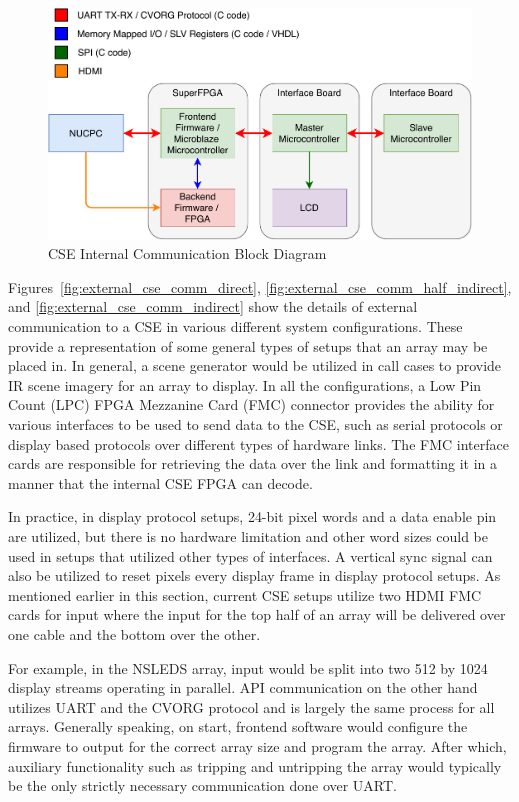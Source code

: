     \begin{figure}
        \centering
        \includegraphics[width=1.0\textwidth]{fig/cse_comm_block.pdf}
        \caption{CSE Internal Communication Block Diagram}
        \label{fig:cse_comm_block}
    \end{figure}

    Figures~\ref{fig:external_cse_comm_direct}, \ref{fig:external_cse_comm_half_indirect}, and \ref{fig:external_cse_comm_indirect} show the details of external communication to a CSE in various different system configurations. These provide a representation of some general types of setups that an array may be placed in. In general, a scene generator would be utilized in call cases to provide IR scene imagery for an array to display. In all the configurations, a Low Pin Count (LPC) FPGA Mezzanine Card (FMC) connector provides the ability for various interfaces to be used to send data to the CSE, such as serial protocols or display based protocols over different types of hardware links. The FMC interface cards are responsible for retrieving the data over the link and formatting it in a manner that the internal CSE FPGA can decode.

    In practice, in display protocol setups, 24-bit pixel words and a data enable pin are utilized, but there is no hardware limitation and other word sizes could be used in setups that utilized other types of interfaces. A vertical sync signal can also be utilized to reset pixels every display frame in display protocol setups. As mentioned earlier in this section, current CSE setups utilize two HDMI FMC cards for input where the input for the top half of an array will be delivered over one cable and the bottom over the other.

    For example, in the NSLEDS array, input would be split into two 512 by 1024 display streams operating in parallel. API communication on the other hand utilizes UART and the CVORG protocol and is largely the same process for all arrays. Generally speaking, on start, frontend software would configure the firmware to output for the correct array size and program the array. After which, auxiliary functionality such as tripping and untripping the array would typically be the only strictly necessary communication done over UART.

